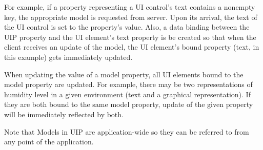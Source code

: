 For example, if a property representing a UI control's text contains a nonempty key, the appropriate model is requested from server. Upon its arrival, the text of the UI control is set to the property's value. Also, a data binding between the UIP property and the UI element's text property is be created so that when the client receives an update of the model, the UI element's bound property (text, in this example) gets immediately updated.

When updating the value of a model property, all UI elements bound to the model property are updated. For example, there may be two representations of humidity level in a given environment (text and a graphical representation). If they are both bound to the same model property, update of the given property will be immediately reflected by both.

Note that Models in UIP are application-wide so they can be referred to from any point of the application.

\endinput